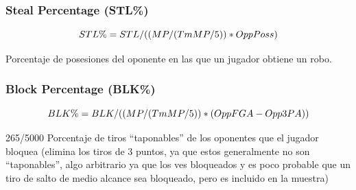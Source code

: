 \documentclass[
]{article}
\newenvironment{Shaded}{\begin{snugshade}}{\end{snugshade}}
\newcommand{\DecValTok}[1]{\textcolor[rgb]{0.00,0.00,0.81}{#1}}
\newcommand{\KeywordTok}[1]{\textcolor[rgb]{0.13,0.29,0.53}{\textbf{#1}}}
\newcommand{\NormalTok}[1]{#1}
\newcommand{\OperatorTok}[1]{\textcolor[rgb]{0.81,0.36,0.00}{\textbf{#1}}}
\newcommand{\StringTok}[1]{\textcolor[rgb]{0.31,0.60,0.02}{#1}}
\begin{document}
\hypertarget{steal-percentage-stl}{%
\subsubsection{Steal Percentage (STL\%)}\label{steal-percentage-stl}}

\[
  \makebox[\linewidth]{$STL\% = STL / ((MP / (TmMP / 5)) * OppPoss)$}
\]

Porcentaje de posesiones del oponente en las que un jugador obtiene un
robo.

\begin{Shaded}
\end{Shaded}

\hypertarget{block-percentage-blk}{%
\subsubsection{Block Percentage (BLK\%)}\label{block-percentage-blk}}

\[
  \makebox[\linewidth]{$BLK\% = BLK / ((MP / (TmMP / 5 )) * (OppFGA - Opp3PA))$}
\]

265/5000 Porcentaje de tiros ``taponables'' de los oponentes que el
jugador bloquea (elimina los tiros de 3 puntos, ya que estos
generalmente no son ``taponables'', algo arbitrario ya que los ves
bloqueados y es poco probable que un tiro de salto de medio alcance sea
bloqueado, pero es incluido en la muestra)

\begin{Shaded}
\end{Shaded}
\end{document}
